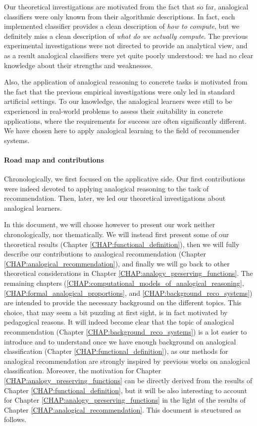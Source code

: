 Our theoretical investigations are motivated from the fact that so far,
analogical classifiers were only known from their algorithmic descriptions.
In fact, each implemented classifier provides a clean description
of {\it how to compute}, but we definitely miss a clean description of {\it
what do we actually compute}. The previous experimental investigations were not
directed to provide an analytical view, and as a result analogical classifiers
were yet quite poorly understood: we had no clear knowledge about their strengths
and weaknesses.

Also, the application of analogical reasoning to concrete tasks is motivated
from the fact that the previous empirical investigations were only led in
standard artificial settings. To our knowledge, the analogical learners were
still 
to be experienced in real-world problems to assess their suitability in concrete
applications, where the requirements for success are often significantly
different. We have chosen here to apply analogical learning to the field of
recommender systems.

\paragraph{Road map and contributions\\}

Chronologically, we first focused on the applicative side. Our first
contributions were indeed devoted to applying analogical reasoning to the task
of recommendation. Then, later, we led our theoretical investigations about
analogical learners.

In this document, we will choose however to present our work neither
chronologically, nor thematically. We will instead first present some of our
theoretical results (Chapter \ref{CHAP:functional_definition}), then we will
fully describe our contributions to analogical recommendation (Chapter
\ref{CHAP:analogical_recommendation}), and finally we will go back to other
theoretical considerations in Chapter \ref{CHAP:analogy_preserving_functions}.
The remaining chapters
(\ref{CHAP:computational_models_of_analogical_reasoning},
\ref{CHAP:formal_analogical_proportions}, and
\ref{CHAP:background_reco_systems}) are intended to provide the necessary
background on the different topics. This choice, that may seem a bit puzzling
at first sight, is in fact motivated by pedagogical reasons. It will indeed
become clear that the topic of analogical recommendation (Chapter
\ref{CHAP:background_reco_systems}) is a lot easier to
introduce and to understand once we have enough background on analogical
classification (Chapter \ref{CHAP:functional_definition}), as our methods for
analogical recommendation are strongly inspired by previous works on analogical
classification. Moreover, the motivation for Chapter
\ref{CHAP:analogy_preserving_functions} can be directly derived from the
results of Chapter \ref{CHAP:functional_definition}, but it will be also
interesting to account for Chapter \ref{CHAP:analogy_preserving_functions} in
the light of the results of Chapter \ref{CHAP:analogical_recommendation}.  This
document is structured as follows.\\

